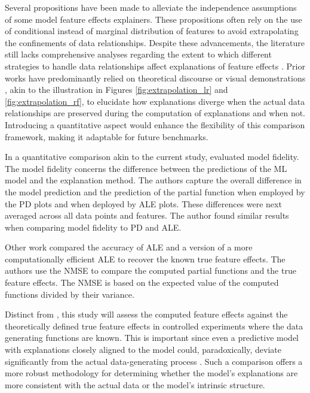Several propositions have been made to alleviate the independence assumptions of some model feature effects explainers. These propositions often rely on the use of conditional instead of marginal distribution of features to avoid extrapolating the confinements of data relationships. Despite these advancements, the literature still lacks comprehensive analyses regarding the extent to which different strategies to handle data relationships affect explanations of feature effects \cite{Molnar2022GeneralModels}. Prior works have predominantly relied on theoretical discourse or visual demonstrations \cite{Apley2020VisualizingModels, Gkolemis2022DALE:Explanations, Gkolemis2023RHALE:Effects, Mangalathu2022Machine-learningSystems, Bakhshi2021UtilizingModels}, akin to the illustration in Figures \ref{fig:extrapolation_lr} and \ref{fig:extrapolation_rf}, to elucidate how explanations diverge when the actual data relationships are preserved during the computation of explanations and when not. Introducing a quantitative aspect would enhance the flexibility of this comparison framework, making it adaptable for future benchmarks. 

In a quantitative comparison akin to the current study, \cite{Molnar2023Model-agnosticApproach} evaluated model fidelity. The model fidelity concerns the difference between the predictions of the \gls{ML} model and the explanation method. The authors capture the overall difference in the model prediction and the prediction of the partial function when employed by the \gls{PD} plots and when deployed by \gls{ALE} plots. These differences were next averaged across all data points and features. The author found similar results when comparing model fidelity to \gls{PD} and \gls{ALE}.

Other work \cite{Gkolemis2022DALE:Explanations} compared the accuracy of \gls{ALE} and a version of a more computationally efficient ALE to recover the known true feature effects. The authors use the \gls{NMSE} to compare the computed partial functions and the true feature effects. The \gls{NMSE} is based on the expected value of the computed functions divided by their variance. 

Distinct from \cite{Molnar2023Model-agnosticApproach}, this study will assess the computed feature effects against the theoretically defined true feature effects in controlled experiments where the data generating functions are known. This is important since even a predictive model with explanations closely aligned to the model could, paradoxically, deviate significantly from the actual data-generating process \cite{Fisher2018AllSimultaneously, Slack2020FoolingSHAP}.  Such a comparison offers a more robust methodology for determining whether the model's explanations are more consistent with the actual data or the model's intrinsic structure. 


